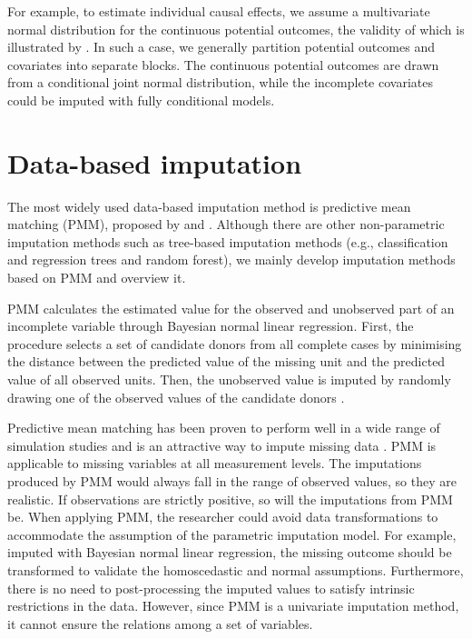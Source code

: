For example, to estimate individual causal effects, we assume a multivariate normal distribution for the continuous potential outcomes, the validity of which is illustrated by \citet{imbens2015causal}. In such a case, we generally partition potential outcomes and covariates into separate blocks. The continuous potential outcomes are drawn from a conditional joint normal distribution, while the incomplete covariates could be imputed with fully conditional models. 

\section{Data-based imputation}
The most widely used data-based imputation method is predictive mean matching (PMM), proposed by \citet{rubin1986statistical} and \citet{little1988missing}. Although there are other non-parametric imputation methods such as tree-based imputation methods (e.g., classification and regression trees and random forest), we mainly develop imputation methods based on PMM and overview it. 

PMM calculates the estimated value for the observed and unobserved part of an incomplete variable through Bayesian normal linear regression. First, the procedure selects a set of candidate donors from all complete cases by minimising the distance between the predicted value of the missing unit and the predicted value of all observed units. Then, the unobserved value is imputed by randomly drawing one of the observed values of the candidate donors \citep{Buuren2018}.

Predictive mean matching has been proven to perform well in a wide range of simulation studies and is an attractive way to impute missing data \citep{Buuren2011, Heitjan1991, Morris2014, Vink2014, Vink2015}. PMM is applicable to missing variables at all measurement levels. The imputations produced by PMM would always fall in the range of observed values, so they are realistic. If observations are strictly positive, so will the imputations from PMM be. When applying PMM, the researcher could avoid data transformations to accommodate the assumption of the parametric imputation model. For example, imputed with Bayesian normal linear regression, the missing outcome should be transformed to validate the homoscedastic and normal assumptions. Furthermore, there is no need to post-processing the imputed values to satisfy intrinsic restrictions in the data. However, since PMM is a univariate imputation method, it cannot ensure the relations among a set of variables. 

